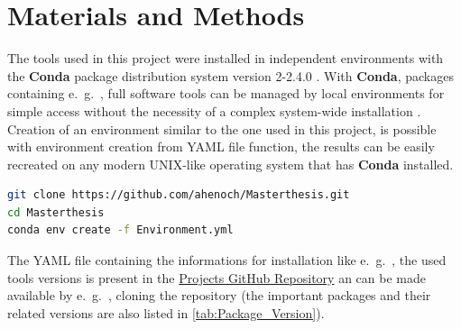 \chapter{Materials and Methods} \label{chap:Materials_and_Methods}

The tools used in this project were installed in independent environments with the \textbf{Conda} package distribution system version 2-2.4.0 \autocite{anaconda_software_distribution_anaconda_2020}. With \textbf{Conda}, packages containing e.~g.~, full software tools can be managed by local environments for simple access without the necessity of a complex system-wide installation \autocite{anaconda_software_distribution_anaconda_2020}. Creation of an environment similar to the one used in this project, is possible with environment creation from YAML file function, the results can be easily recreated on any modern UNIX-like operating system that has \textbf{Conda} installed. 

\begin{lstlisting}[language=sh]
git clone https://github.com/ahenoch/Masterthesis.git
cd Masterthesis
conda env create -f Environment.yml
\end{lstlisting}  

The YAML file containing the informations for installation like e.~g.~, the used tools versions is present in the \href{https://github.com/ahenoch/Masterthesis.git}{Projects GitHub Repository} an can be made available by e.~g.~, cloning the repository (the important packages and their related versions are also listed in \autoref{tab:Package_Version}).

\begin{table}[hbt]
    \centering
    \caption[Package Version]{\textbf{Package Version.} The packages that need to be installed by Conda in a specific version for the pipeline to work as proposed in this project are listed in this table. Other related packages necessary for execution of the listed ones installed automatically by Conda.}
    \label{tab:Package_Version}
\end{table}

